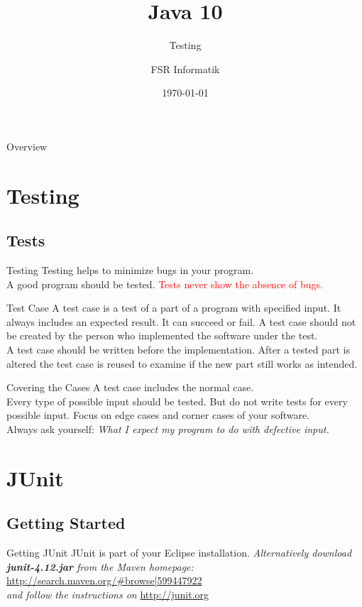

\title{Java 10}
\subtitle{Testing}
\author{FSR Informatik}
\date{\today}



\begin{frame}
\titlepage
\end{frame}

\begin{frame}{Overview}
\tableofcontents
\end{frame}

\section{Testing}
\subsection{Tests}
\begin{frame}{Testing}
	Testing helps to minimize bugs in your program. \\
	A good program should be tested.
	\vfill
	\textcolor{red}{Tests never show the absence of bugs.}
\end{frame}

\begin{frame}{Test Case}
	A test case is a test of a part of a program with specified input. 
	It always includes an expected result.
	It can succeed or fail.
	\vfill
	A test case should not be created by the person who implemented the software under the test. \\
	A test case should be written before the implementation.
	\vfill
	After a tested part is altered the test case is reused to examine if the new part still works as intended.
\end{frame}
\begin{frame}{Covering the Cases}
	A test case includes the normal case. \\
	Every type of possible input should be tested. But do not write tests for every possible input.
	\vfill
	Focus on edge cases and corner cases of your software. \\
	Always ask yourself: \emph{What I expect my program to do with defective input.}
\end{frame}


\section{JUnit}
\subsection{Getting Started}
\begin{frame}{Getting JUnit}
	JUnit is part of your Eclipse installation.
	\vfill
	\emph{Alternatively download \textbf{junit-4.12.jar} from the Maven homepage:}\\
	\url{http://search.maven.org/\#browse|599447922} \\
	\emph{and follow the instructions on} \url{http://junit.org}
\end{frame}

